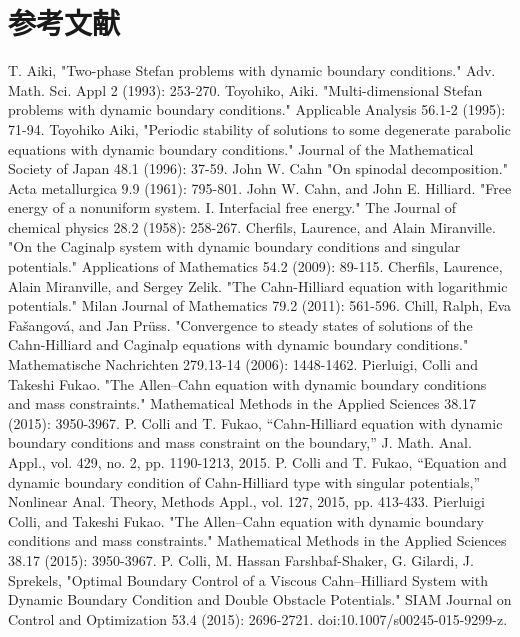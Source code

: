 \documentclass[a4paper]{article}
\begin{document}
\section{参考文献}
\begin{thebibliography}{99}
		T. Aiki, "Two-phase Stefan problems with dynamic boundary conditions." Adv. Math. Sci. Appl 2 (1993): 253-270.
		Toyohiko, Aiki. "Multi-dimensional Stefan problems with dynamic boundary conditions." Applicable Analysis 56.1-2 (1995): 71-94.
		Toyohiko Aiki, "Periodic stability of solutions to some degenerate parabolic equations with dynamic boundary conditions." Journal of the Mathematical Society of Japan 48.1 (1996): 37-59.
		John W. Cahn "On spinodal decomposition." Acta metallurgica 9.9 (1961): 795-801.
		John W. Cahn, and John E. Hilliard. "Free energy of a nonuniform system. I. Interfacial free energy." The Journal of chemical physics 28.2 (1958): 258-267.
		Cherfils, Laurence, and Alain Miranville. "On the Caginalp system with dynamic boundary conditions and singular potentials." Applications of Mathematics 54.2 (2009): 89-115.
		Cherfils, Laurence, Alain Miranville, and Sergey Zelik. "The Cahn-Hilliard equation with logarithmic potentials." Milan Journal of Mathematics 79.2 (2011): 561-596.
		Chill, Ralph, Eva Fa\v{s}angov\'a, and Jan Pr\"uss. "Convergence to steady states of solutions of the Cahn-Hilliard and Caginalp equations with dynamic boundary conditions." Mathematische Nachrichten 279.13‐14 (2006): 1448-1462.
		Pierluigi, Colli and Takeshi Fukao. "The Allen–Cahn equation with dynamic boundary conditions and mass constraints." Mathematical Methods in the Applied Sciences 38.17 (2015): 3950-3967.
		P. Colli and T. Fukao, “Cahn-Hilliard equation with dynamic boundary conditions and mass constraint on the boundary,” J. Math. Anal. Appl., vol. 429, no. 2, pp. 1190-1213, 2015.
		P. Colli and T. Fukao, “Equation and dynamic boundary condition of Cahn-Hilliard type with singular potentials,” Nonlinear Anal. Theory, Methods Appl., vol. 127, 2015, pp. 413-433.
		Pierluigi Colli, and Takeshi Fukao. "The Allen–Cahn equation with dynamic boundary conditions and mass constraints." Mathematical Methods in the Applied Sciences 38.17 (2015): 3950-3967.
		P. Colli, M. Hassan Farshbaf-Shaker, G. Gilardi, J. Sprekels, "Optimal Boundary Control of a Viscous Cahn--Hilliard System with Dynamic Boundary Condition and Double Obstacle Potentials." SIAM Journal on Control and Optimization 53.4 (2015): 2696-2721. doi:10.1007/s00245-015-9299-z.

\end{thebibliography}
\end{document}
